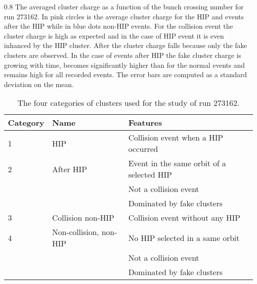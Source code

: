                  {0.8}       %
                 {The averaged cluster charge as a function of the bunch crossing number for run 273162. In pink circles is the average cluster charge for the HIP and events after the HIP while in blue dots non-HIP events. For the collision event the cluster charge is high as expected and in the case of HIP event it is even inhanced by the HIP cluster. After the cluster charge falls because only the fake clusters are observed. In the case of events after HIP the fake cluster charge is growing with time, becomes significantly higher than for the normal events and remains high for all recorded events. The error bars are computed as a standard deviation on the mean. } %



\begin{table}[h]
\begin{center}
\begin{tabular}{|l|l|l|}
\hline
Category & Name  & Features \\
\hline
1 & HIP & Collision event when a HIP occurred \\
\hline
2 & After HIP & Event in the same orbit of a selected HIP \\
& & Not a collision event \\
& & Dominated by fake clusters \\
\hline
3 & Collision non-HIP & Collision event without any HIP \\
\hline
4 & Non-collision, non-HIP  & No HIP selected in a same orbit \\
& & Not a collision event \\
& & Dominated by fake clusters \\
\hline
\end{tabular}
\caption[Table caption text]{The four categories of clusters used for the study of run 273162. }
\label{tab:eventCategories}
\end{center}
\end{table}



